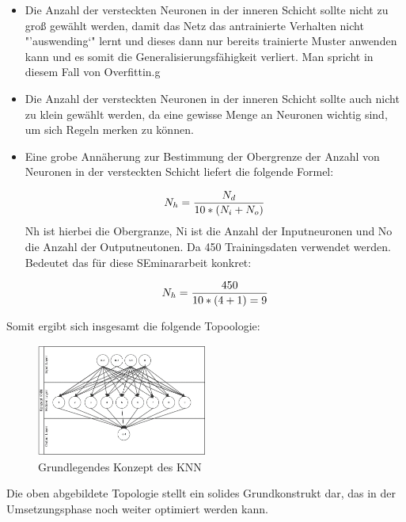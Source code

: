 \begin{itemize}
\item Die Anzahl der versteckten Neuronen in der inneren Schicht sollte nicht zu groß gewählt werden, damit das Netz das antrainierte Verhalten nicht "'auswending`" lernt und dieses dann nur bereits trainierte Muster anwenden kann und es somit die Generalisierungsfähigkeit verliert. Man spricht in diesem Fall von Overfittin.g 
\item Die Anzahl der versteckten Neuronen in der inneren Schicht sollte auch nicht zu klein gewählt werden, da eine gewisse Menge an Neuronen wichtig sind, um sich Regeln merken zu können.
\item Eine grobe Annäherung zur Bestimmung der Obergrenze der Anzahl von Neuronen in der versteckten Schicht liefert die folgende Formel:

\begin{equation}\formelentry{Optimale Anzahl Neuronen in der versteckten Schicht}
  N_h = \frac{N_d}{10*(N_i+N_o)}
\end{equation}
Nh ist hierbei die Obergranze, Ni ist die Anzahl der Inputneuronen und No die Anzahl der Outputneutonen. Da 450 Trainingsdaten verwendet werden. Bedeutet das für diese SEminararbeit konkret:

\begin{equation}\formelentry{Optimale Anzahl Neuronen in der versteckten Schicht}
  N_h = \frac{450}{10*(4+1) = 9 }   
\end{equation}
\end{itemize}
 

Somit ergibt sich insgesamt die folgende Topoologie:

\begin{figure}[H]
\centering
		\includegraphics[width=0.5\textwidth]{KonzKNN.PNG}
	\caption{Grundlegendes Konzept des KNN}
	\label{fig:Grundlegendes Konzept des KNN}
\end{figure}


Die oben abgebildete Topologie stellt ein solides Grundkonstrukt dar, das in der Umsetzungsphase noch weiter optimiert werden kann.



